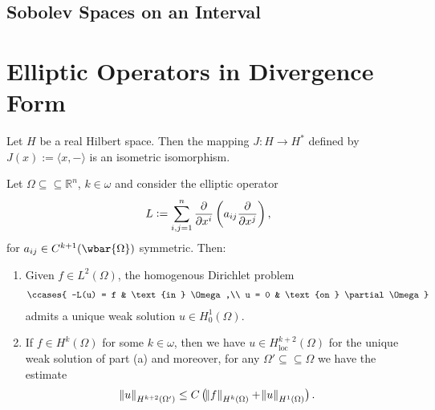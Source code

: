 \subsection*{Sobolev Spaces on an Interval}

\section*{Elliptic Operators in Divergence Form}

\begin{lemma}
	\label{lem:PI}
\end{lemma}

\begin{theorem}
	\label{thm:RRT}
	Let $H$ be a real Hilbert space. Then the mapping $J : H \to H^*$ defined by $J(x) := \langle x,-\rangle$ is an isometric isomorphism.
\end{theorem}

\begin{theorem}
	Let $\Omega \subseteq\subseteq \mathbb{R}^n$, $k \in \omega$ and consider the elliptic operator
	\begin{equation*}
		L := \sum_{i,j = 1}^n \frac{\partial}{\partial x^i}\del[3]{a_{ij}\frac{\partial}{\partial x^j}},
	\end{equation*}
	\noindent for $a_{ij} \in C^{k + 1}(\wbar{\Omega})$ symmetric. Then:
	\begin{enumerate}[label = \textup{(}\alph*\textup{)},wide=0pt]
		\item Given $f \in L^2(\Omega)$, the homogenous Dirichlet problem
			\begin{align}
				\label{eq:HDP}
				\ccases{
					-L(u) = f & \text{in } \Omega,\\
					u = 0 & \text{on } \partial\Omega
				}
			\end{align}
			\noindent admits a unique weak solution $u \in H^1_0(\Omega)$.
		\item If $f \in H^k(\Omega)$ for some $k \in \omega$, then we have $u \in H^{k + 2}_{\mathrm{loc}}(\Omega)$ for the unique weak solution of part (a) and moreover, for any $\Omega' \subseteq \subseteq \Omega$ we have the estimate
			\begin{equation*}
				\norm{u}_{H^{k + 2}(\Omega')} \leq C\del[1]{\norm{f}_{H^k(\Omega)} + \norm{u}_{H^1(\Omega)}}.
			\end{equation*}
	\end{enumerate}
\end{theorem}

